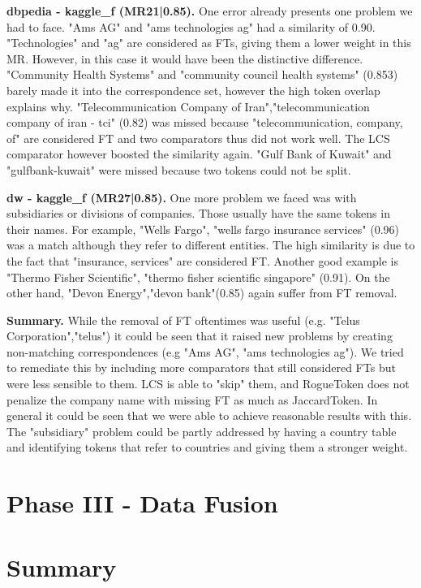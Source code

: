 \documentclass[11pt,titlepage,oneside,openany]{article}
\begin{document}
\textbf{dbpedia - kaggle\_f (MR21|0.85). } One error already presents one problem we had to face. "Ams AG" and "ams technologies ag" had a similarity of 0.90. "Technologies" and "ag" are considered as FTs, giving them a lower weight in this MR. However, in this case it would have been the distinctive difference. "Community Health Systems" and "community council health systems" (0.853) barely made it into the correspondence set, however the high token overlap explains why. "Telecommunication Company of Iran","telecommunication company of iran - tci" (0.82) was missed because "telecommunication, company, of" are considered FT and two comparators thus did not work well. The LCS comparator however boosted the similarity again. "Gulf Bank of Kuwait" and "gulfbank-kuwait" were missed because two tokens could not be split.

\textbf{dw - kaggle\_f (MR27|0.85). } One more problem we faced was with subsidiaries or divisions of companies. Those usually have the same tokens in their names. For example, "Wells Fargo", "wells fargo insurance services" (0.96) was a match although they refer to different entities. The high similarity is due to the fact that "insurance, services" are considered FT. Another good example is "Thermo Fisher Scientific", "thermo fisher scientific singapore" (0.91). On the other hand, "Devon Energy","devon bank"(0.85) again suffer from FT removal.

\textbf{Summary. }While the removal of FT oftentimes was useful (e.g. "Telus Corporation","telus") it could be seen that it raised new problems by creating non-matching correspondences (e.g "Ams AG", "ams technologies ag"). We tried to remediate this by including more comparators that still considered FTs but were less sensible to them. LCS is able to "skip" them, and RogueToken does not penalize the company name with missing FT as much as JaccardToken. In general it could be seen that we were able to achieve reasonable results with this. The "subsidiary" problem could be partly addressed by having a country table and identifying tokens that refer to countries and giving them a stronger weight.



\section{Phase III - Data Fusion}
\label{cha:data-fusion}



\section{Summary}
\end{document}
